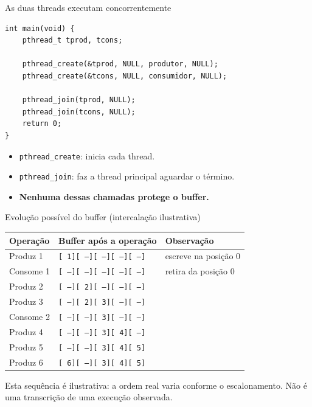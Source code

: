 \documentclass[aspectratio=169,11pt]{beamer}
\begin{document}
\begin{frame}[fragile]{As duas threads executam concorrentemente}
\begin{lstlisting}
int main(void) {
    pthread_t tprod, tcons;

    pthread_create(&tprod, NULL, produtor, NULL);
    pthread_create(&tcons, NULL, consumidor, NULL);

    pthread_join(tprod, NULL);
    pthread_join(tcons, NULL);
    return 0;
}
\end{lstlisting}
\begin{itemize}
\item \texttt{pthread\_create}: inicia cada thread.
\item \texttt{pthread\_join}: faz a thread principal aguardar o término.
\item \textbf{Nenhuma dessas chamadas protege o buffer.}
\end{itemize}
\end{frame}

\begin{frame}{Evolução possível do buffer (intercalação ilustrativa)}
\small
\begin{center}
\begin{tabular}{lll}
\toprule
\textbf{Operação} & \textbf{Buffer após a operação} & \textbf{Observação}\\
\midrule
\textcolor{verdeprod}{Produz 1} & \texttt{[ 1][ --][ --][ --][ --]} & \textcolor{verdeprod}{escreve na posição 0}\\
\textcolor{azulcons}{Consome 1} & \texttt{[ --][ --][ --][ --][ --]} & \textcolor{azulcons}{retira da posição 0}\\
\textcolor{verdeprod}{Produz 2} & \texttt{[ --][ 2][ --][ --][ --]} & \\
\textcolor{verdeprod}{Produz 3} & \texttt{[ --][ 2][ 3][ --][ --]} & \\
\textcolor{azulcons}{Consome 2} & \texttt{[ --][ --][ 3][ --][ --]} & \\
\textcolor{verdeprod}{Produz 4} & \texttt{[ --][ --][ 3][ 4][ --]} & \\
\textcolor{verdeprod}{Produz 5} & \texttt{[ --][ --][ 3][ 4][ 5]} & \\
\textcolor{verdeprod}{Produz 6} & \texttt{[ 6][ --][ 3][ 4][ 5]} & \\
\bottomrule
\end{tabular}
\end{center}
\vfill
\footnotesize\textcolor{cinza}{Esta sequência é ilustrativa: a ordem real varia conforme o escalonamento. Não é uma transcrição de uma execução observada.}
\end{frame}
\end{document}
